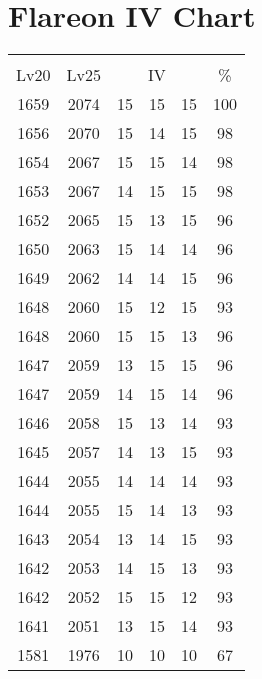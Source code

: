 \documentclass{article}%
\begin{document}
%
\normalsize%
\section{Flareon IV Chart}%
\label{sec:Flareon IV Chart}%
\renewcommand{\arraystretch}{1.5}%
\begin{tabular}{|c|c|c|c|c|c|}%
\hline%
\multicolumn{6}{|c|}{\textcolor{white}{ 
\linebreak{Flareon}
}%
\cellcolor{black}}\\%
\multicolumn{1}{|c}{Lv20}&\multicolumn{1}{c|}{Lv25}&\multicolumn{3}{c|}{IV}&\multicolumn{1}{|c|}{\%}\\%
\hline%
\rowcolor{color100}%
1659&2074&15&15&15&100\\%
\hline%
\rowcolor{color98}%
1656&2070&15&14&15&98\\%
\hline%
\rowcolor{color98}%
1654&2067&15&15&14&98\\%
\hline%
\rowcolor{color98}%
1653&2067&14&15&15&98\\%
\hline%
\rowcolor{color96}%
1652&2065&15&13&15&96\\%
\hline%
\rowcolor{color96}%
1650&2063&15&14&14&96\\%
\hline%
\rowcolor{color96}%
1649&2062&14&14&15&96\\%
\hline%
\rowcolor{color93}%
1648&2060&15&12&15&93\\%
\hline%
\rowcolor{color96}%
1648&2060&15&15&13&96\\%
\hline%
\rowcolor{color96}%
1647&2059&13&15&15&96\\%
\hline%
\rowcolor{color96}%
1647&2059&14&15&14&96\\%
\hline%
\rowcolor{color93}%
1646&2058&15&13&14&93\\%
\hline%
\rowcolor{color93}%
1645&2057&14&13&15&93\\%
\hline%
\rowcolor{color93}%
1644&2055&14&14&14&93\\%
\hline%
\rowcolor{color93}%
1644&2055&15&14&13&93\\%
\hline%
\rowcolor{color93}%
1643&2054&13&14&15&93\\%
\hline%
\rowcolor{color93}%
1642&2053&14&15&13&93\\%
\hline%
\rowcolor{color93}%
1642&2052&15&15&12&93\\%
\hline%
\rowcolor{color93}%
1641&2051&13&15&14&93\\%
\hline%
\rowcolor{color91}%
1581&1976&10&10&10&67\\%
\end{tabular}

%
\end{document}
